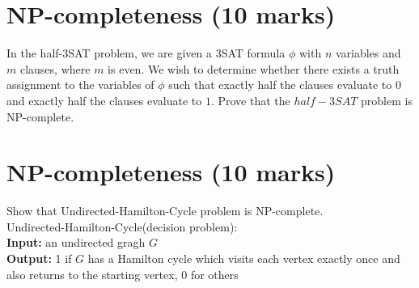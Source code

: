 \documentclass[a4paper,11pt]{article}
\begin{document}
\section{NP-completeness (10 marks)}

In the {\sc half-3SAT} problem, we are given a 3SAT formula $\phi$ with $n$ variables and $m$ clauses, where $m$ is even. We wish to determine whether there exists a truth assignment to the variables of $\phi$ such that exactly half the clauses evaluate to $0$ and exactly half the clauses evaluate to $1$. Prove that the $half-3SAT$ problem is NP-complete.

\section{NP-completeness (10 marks)}

Show that {\sc Undirected-Hamilton-Cycle} problem is NP-complete.\\
{\sc Undirected-Hamilton-Cycle(decision problem)}:\\
{\bf Input:} an undirected gragh $G$\\
{\bf Output:} 1 if $G$ has a Hamilton cycle which visits each vertex exactly once and also returns to the starting vertex, 0 for others\\

% 
\end{document}

